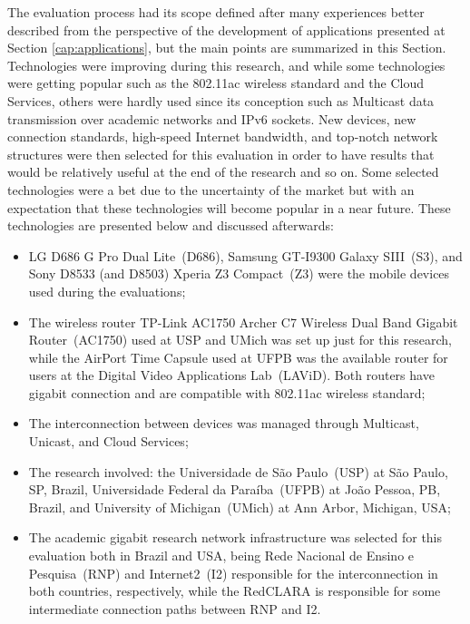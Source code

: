 The evaluation process had its scope defined after many experiences better described from the perspective of the development of applications presented at Section \ref{cap:applications}, but the main points are summarized in this Section.
Technologies were improving during this research, and while some technologies were getting popular such as the 802.11ac wireless standard and the Cloud Services, others were hardly used since its conception such as Multicast data transmission over academic networks and IPv6 sockets.
New devices, new connection standards, high-speed Internet bandwidth, and top-notch network structures were then selected for this evaluation in order to have results that would be relatively useful at the end of the research and so on.
Some selected technologies were a bet due to the uncertainty of the market but with an expectation that these technologies will become popular in a near future.
These technologies are presented below and discussed afterwards:
\begin{itemize}
	\item LG D686 G Pro Dual Lite~(D686), Samsung GT-I9300 Galaxy SIII~(S3), and Sony D8533 (and D8503) Xperia Z3 Compact~(Z3) were the mobile devices used during the evaluations;
	\item The wireless router TP-Link AC1750 Archer C7 Wireless Dual Band Gigabit Router~(AC1750) used at USP and UMich was set up just for this research, while the AirPort Time Capsule used at UFPB was the available router for users at the Digital Video Applications Lab~(LAViD). Both routers have gigabit connection and are compatible with 802.11ac wireless standard;
	\item The interconnection between devices was managed through Multicast, Unicast, and Cloud Services;
	\item The research involved: the Universidade de São Paulo~(USP) at São Paulo, SP, Brazil, Universidade Federal da Paraíba~(UFPB) at João Pessoa, PB, Brazil, and University of Michigan~(UMich) at Ann Arbor, Michigan, USA;
	\item The academic gigabit research network infrastructure was selected for this evaluation both in Brazil and USA, being Rede Nacional de Ensino e Pesquisa~(RNP) and Internet2~(I2) responsible for the interconnection in both countries, respectively, while the RedCLARA is responsible for some intermediate connection paths between RNP and I2.
\end{itemize}

